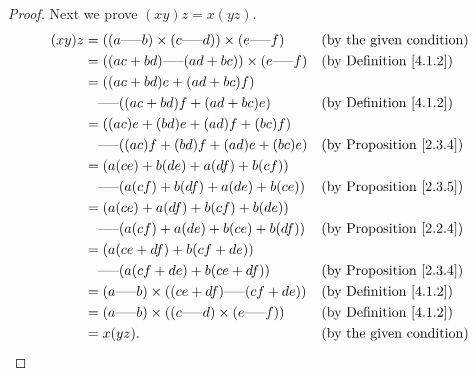 \begin{proof}
    Next we prove \((xy)z = x(yz)\).
    \begin{align*}
        (xy)z & = ((a \text{-----} b) \times (c \text{-----} d)) \times (e \text{-----} f) &  & \text{(by the given condition)}     \\
              & = ((ac + bd) \text{-----} (ad + bc)) \times (e \text{-----} f)             &  & \text{(by Definition \ref{4.1.2})}  \\
              & = ((ac + bd)e + (ad + bc)f)                                                                                         \\
              & \quad \text{-----} ((ac + bd)f + (ad + bc)e)                               &  & \text{(by Definition \ref{4.1.2})}  \\
              & = ((ac)e + (bd)e + (ad)f + (bc)f)                                                                                   \\
              & \quad \text{-----} ((ac)f + (bd)f + (ad)e + (bc)e)                         &  & \text{(by Proposition \ref{2.3.4})} \\
              & = (a(ce) + b(de) + a(df) + b(cf))                                                                                   \\
              & \quad \text{-----} (a(cf) + b(df) + a(de) + b(ce))                         &  & \text{(by Proposition \ref{2.3.5})} \\
              & = (a(ce) + a(df) + b(cf) + b(de))                                                                                   \\
              & \quad \text{-----} (a(cf) + a(de) + b(ce) + b(df))                         &  & \text{(by Proposition \ref{2.2.4})} \\
              & = (a(ce + df) + b(cf + de))                                                                                         \\
              & \quad \text{-----} (a(cf + de) + b(ce + df))                               &  & \text{(by Proposition \ref{2.3.4})} \\
              & = (a \text{-----} b) \times ((ce + df) \text{-----} (cf + de))             &  & \text{(by Definition \ref{4.1.2})}  \\
              & = (a \text{-----} b) \times ((c \text{-----} d) \times (e \text{-----} f)) &  & \text{(by Definition \ref{4.1.2})}  \\
              & = x(yz).                                                                   &  & \text{(by the given condition)}
    \end{align*}


\end{proof}
